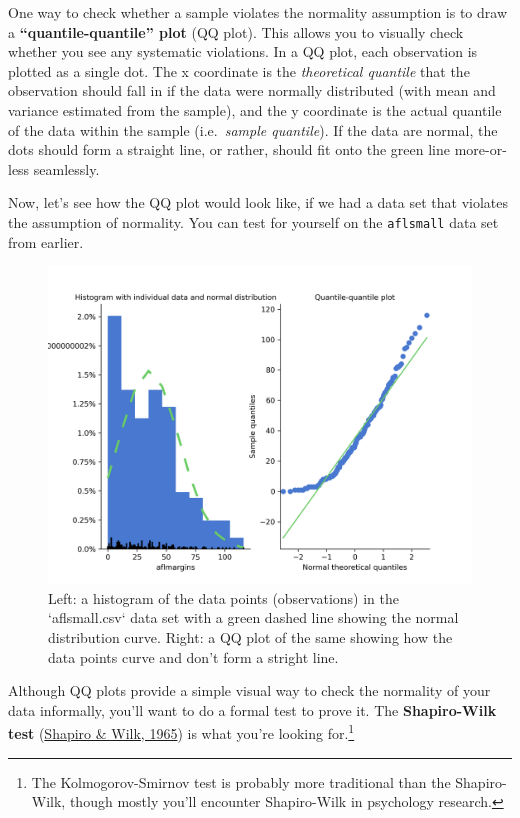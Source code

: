 \documentclass[
]{book}
\theoremstyle{definition}
\theoremstyle{definition}
\theoremstyle{definition}
\theoremstyle{definition}
\theoremstyle{remark}
\begin{document}
One way to check whether a sample violates the normality assumption is to draw a \textbf{``quantile-quantile'' plot} (QQ plot). This allows you to visually check whether you see any systematic violations. In a QQ plot, each observation is plotted as a single dot. The x coordinate is the \emph{theoretical quantile} that the observation should fall in if the data were normally distributed (with mean and variance estimated from the sample), and the y coordinate is the actual quantile of the data within the sample (i.e.~\emph{sample quantile}). If the data are normal, the dots should form a straight line, or rather, should fit onto the green line more-or-less seamlessly.

Now, let's see how the QQ plot would look like, if we had a data set that violates the assumption of normality. You can test for yourself on the \texttt{aflsmall} data set from earlier.

\begin{figure}

{\centering \includegraphics[width=0.66\linewidth]{resources/image/aflsmallqq} 

}

\caption{Left: a histogram of the data points (observations) in the `aflsmall.csv` data set with a green dashed line showing the normal distribution curve. Right: a QQ plot of the same showing how the data points curve and don't form a stright line.}\label{fig:aflsmallqq}
\end{figure}

Although QQ plots provide a simple visual way to check the normality of your data informally, you'll want to do a formal test to prove it. The \textbf{Shapiro-Wilk test} (\protect\hyperlink{ref-Shapiro1965}{Shapiro \& Wilk, 1965}) is what you're looking for.\footnote{The Kolmogorov-Smirnov test is probably more traditional than the Shapiro-Wilk, though mostly you'll encounter Shapiro-Wilk in psychology research.}
\end{document}
